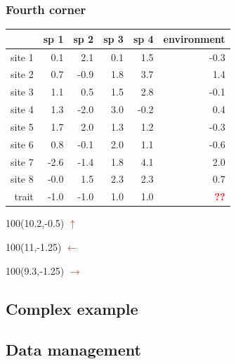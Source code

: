 \documentclass{beamer}
\numberwithin{exercise}{section}
\begin{document}
\begin{frame}
\frametitle{Fourth corner}
\small
\begin{table}[ht]
\begin{center}
\begin{tabular}{r|rrrr|r|}
  & sp 1 & sp 2 & sp 3 & sp 4 & environment \\ 
  \hline
site 1 & 0.1 & 2.1 & 0.1 & 1.5 & -0.3 \\ 
  site 2 & 0.7 & -0.9 & 1.8 & 3.7 & 1.4 \\ 
  site 3 & 1.1 & 0.5 & 1.5 & 2.8 & -0.1 \\ 
  site 4 & 1.3 & -2.0 & 3.0 & -0.2 & 0.4 \\ 
  site 5 & 1.7 & 2.0 & 1.3 & 1.2 & -0.3 \\ 
  site 6 & 0.8 & -0.1 & 2.0 & 1.1 & -0.6 \\ 
  site 7 & -2.6 & -1.4 & 1.8 & 4.1 & 2.0 \\ 
  site 8 & -0.0 & 1.5 & 2.3 & 2.3 & 0.7 \\ 
   \hline
  trait & -1.0 & -1.0 & 1.0 & 1.0 & \textcolor{red}{\textbf{??}} \\ 
   \hline
\end{tabular}
\end{center}
\end{table}\normalsize 
\begin{textblock}{100}(10.2,-0.5)
\textcolor{red}{$\mathbf{\uparrow}$}
\end{textblock}
\begin{textblock}{100}(11,-1.25)
\textcolor{red}{$\mathbf{\leftarrow}$}
\end{textblock}
\begin{textblock}{100}(9.3,-1.25)
\textcolor{red}{$\mathbf{\rightarrow}$}
\end{textblock}
\end{frame}

\subsection{Complex example}



\subsection{Data management}
\end{document}
